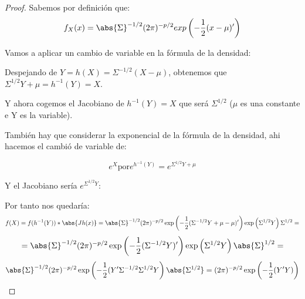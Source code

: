 \begin{proof}
Sabemos por definición que:
\[
f_X(x)=\abs{\Sigma}^{-1/2}(2\pi)^{-p/2} exp \left( -\frac{1}{2}(x-\mu)' \right)
\]

Vamos a aplicar un cambio de variable en la fórmula de la densidad:

Despejando de $Y = h(X)= \Sigma^{-1/2}(X-\mu)$, obtenemos que $\Sigma^{1/2}Y+\mu=h^{-1}(Y)=X$.

Y ahora cogemos el Jacobiano de $h^{-1}(Y)=X$ que será $\Sigma^{1/2}$ ($\mu$ es una constante e Y es la variable).

También hay que considerar la exponencial de la fórmula de la densidad, ahi hacemos el cambió de variable de:

$$e^X \text{por} e^{h^{-1}(Y)}=e^{\Sigma^{1/2}Y+\mu}$$

Y el Jacobiano sería $e^{\Sigma^{1/2}Y}$:


Por tanto nos quedaría:
\[
f(X) = f(h^{-1}(Y))*\abs{Jh(x)} = \abs{\Sigma}^{-1/2}(2 \pi)^{-p/2} \exp\left(-\frac{1}{2}(\Sigma^{-1/2}Y+\mu-\mu)'  \right) \exp\left( \Sigma^{1/2}Y \right) \Sigma^{1/2}  =
\]
\[
= \abs{\Sigma}^{-1/2}(2 \pi)^{-p/2} \exp\left(-\frac{1}{2}(\Sigma^{-1/2}Y)' \right) \exp\left( \Sigma^{1/2}Y \right) \abs{\Sigma}^{1/2} =
\]
\[
\abs{\Sigma}^{-1/2}(2 \pi)^{-p/2} \exp\left(-\frac{1}{2}(Y'\Sigma^{-1/2}\Sigma^{1/2}Y \right) \abs{\Sigma^{1/2}} = (2 \pi)^{-p/2} \exp\left(-\frac{1}{2}(Y'Y) \right)
\]
\end{proof}


